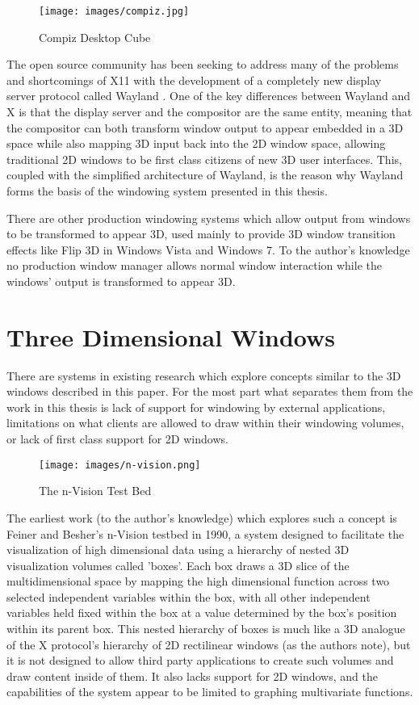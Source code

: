 \begin{figure}[ht!]
\centering
\texttt{[image: images/compiz.jpg]}
\caption{Compiz Desktop Cube \protect\cite{compiz}}
\end{figure}

The open source community has been seeking to address many of the problems and shortcomings of X11 with the development of a completely new display server protocol called Wayland \cite{wayland}. One of the key differences between Wayland and X is that the display server and the compositor are the same entity, meaning that the compositor can both transform window output to appear embedded in a 3D space while also mapping 3D input back into the 2D window space, allowing traditional 2D windows to be first class citizens of new 3D user interfaces. This, coupled with the simplified architecture of Wayland, is the reason why Wayland forms the basis of the windowing system presented in this thesis.

There are other production windowing systems which allow output from windows to be transformed to appear 3D, used mainly to provide 3D window transition effects like Flip 3D in Windows Vista and Windows 7. To the author's knowledge no production window manager allows normal window interaction while the windows' output is transformed to appear 3D.

\section{Three Dimensional Windows}

There are systems in existing research which explore concepts similar to the 3D windows described in this paper. For the most part what separates them from the work in this thesis is lack of support for windowing by external applications, limitations on what clients are allowed to draw within their windowing volumes, or lack of first class support for 2D windows.

\begin{figure}[ht!]
\centering
\texttt{[image: images/n-vision.png]}
\caption{The n-Vision Test Bed \protect\cite{nvision}}
\end{figure}

The earliest work (to the author's knowledge) which explores such a concept is Feiner and Besher's n-Vision testbed \cite{nvision} in 1990, a system designed to facilitate the visualization of high dimensional data using a hierarchy of nested 3D visualization volumes called 'boxes'. Each box draws a 3D slice of the multidimensional space by mapping the high dimensional function across two selected independent variables within the box, with all other independent variables held fixed within the box at a value determined by the box's position within its parent box. This nested hierarchy of boxes is much like a 3D analogue of the X protocol's hierarchy of 2D rectilinear windows (as the authors note), but it is not designed to allow third party applications to create such volumes and draw content inside of them. It also lacks support for 2D windows, and the capabilities of the system appear to be limited to graphing multivariate functions.

